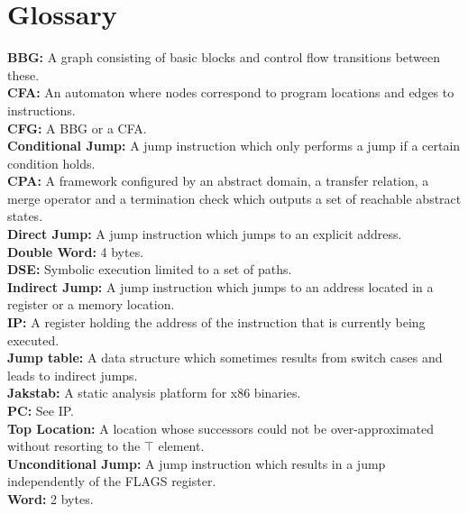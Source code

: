 \documentclass{kththesis}
\begin{document}
\section*{Glossary}
\thispagestyle{empty}
\textbf{BBG:} A graph consisting of basic blocks and control flow transitions between these.\\
\textbf{CFA:} An automaton where nodes correspond to program locations and edges to instructions.\\
\textbf{CFG:} A BBG or a CFA.\\
\textbf{Conditional Jump:} A jump instruction which only performs a jump if a certain condition holds.\\
\textbf{CPA:} A framework configured by an abstract domain, a transfer relation, a merge operator and a termination check which outputs a set of reachable abstract states.\\
\textbf{Direct Jump:} A jump instruction which jumps to an explicit address.\\
\textbf{Double Word:} 4 bytes.\\
\textbf{DSE:} Symbolic execution limited to a set of paths.\\
\textbf{Indirect Jump:} A jump instruction which jumps to an address located in a register or a memory location.\\
\textbf{IP:} A register holding the address of the instruction that is currently being executed.\\
\textbf{Jump table:} A data structure which sometimes results from switch cases and leads to indirect jumps. \\
\textbf{Jakstab:} A static analysis platform for x86 binaries. \\
\textbf{PC:} See IP.\\
\textbf{Top Location:} A location whose successors could not be over-approximated without resorting to the $\top$ element.\\
\textbf{Unconditional Jump:} A jump instruction which results in a jump independently of the FLAGS register.\\
\textbf{Word:} 2 bytes.\\

\listoffigures
\thispagestyle{empty}
\listoftables
\thispagestyle{empty}


\mainmatter
\cleardoublepage
{}
\end{document}
